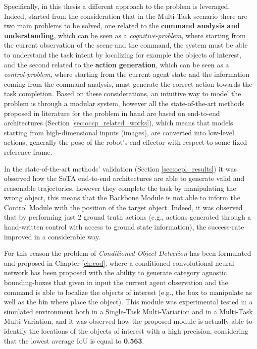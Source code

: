 Specifically, in this thesis a different approach to the problem is leveraged. Indeed, started from the consideration that in the Multi-Task scenario there are two main problems to be solved, one related to the \textbf{command analysis and understanding}, which can be seen as a \textit{cognitive-problem}, where starting from the current observation of the scene and the command, the system must be able to understand the task intent by localizing for example the objects of interest, and the second related to the \textbf{action generation}, which can be seen as a \textit{control-problem}, where starting from the current agent state and the information coming from the command analysis, must generate the correct action towards the task completion. Based on these considerations, an intuitive way to model the problem is through a modular system, however all the state-of-the-art methods proposed in literature for the problem in hand are based on end-to-end architectures (Section \ref{sec:occp_related_works}), which means that models starting from high-dimensional inputs (images), are converted into low-level actions, generally the pose of the robot's end-effector with respect to some fixed reference frame. 

In the state-of-the-art methods' validation (Section \ref{sec:ocpl_results}) it was observed how the SoTA end-to-end architectures are able to generate valid and reasonable trajectories, however they complete the task by manipulating the wrong object, this means that the Backbone Module is not able to inform the Control Module with the position of the target object. Indeed, it was observed that by performing just 2 ground truth actions (e.g., actions generated through a hand-written control with access to ground state information), the success-rate improved in a considerable way.

For this reason the problem of \textit{Conditioned Object Detection} has been formulated and proposed in Chapter \ref{ch:cod}, where a conditioned convolutional neural network has been proposed with the ability to generate category agnostic bounding-boxes that given in input the current agent observation and the command is able to localize the objects of interest (e.g., the box to manipulate as well as the bin where place the object). This module was experimental tested in a simulated environment both in a Single-Task Multi-Variation and in a Multi-Task Multi-Variation, and it was observed how the proposed module is actually able to identify the locations of the objects of interest with a high precision, considering that the lowest average IoU is equal to \textbf{0.563}. 

